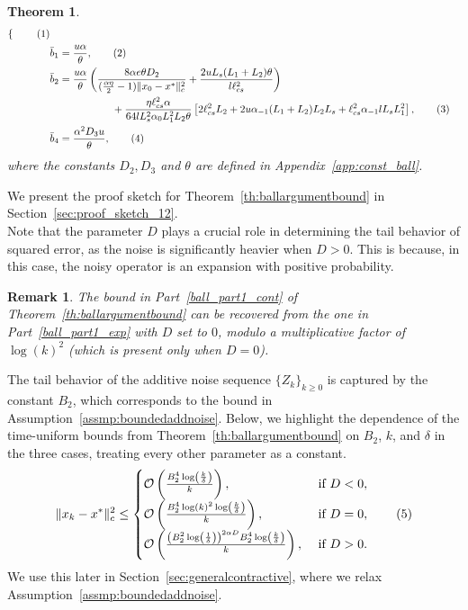 \documentclass{article}
\newcommand{\numberthis}{\addtocounter{equation}{1}\tag{\theequation}}
\newcommand{\lrp}[1]{\left( #1 \right)}
\newcommand{\lrs}[1]{\left[ #1 \right]}
\newcommand{\lcs}{\ell_{cs}}
\newtheorem{theorem}{Theorem}[section]
\newtheorem{remark}{Remark}
\begin{document}
\begin{theorem}
\begin{align*}
\begin{cases}
        \end{cases}\numberthis\label{eq:abar1} \\
        &\bar{b}_1 = \frac{u\alpha }{\theta}, \numberthis\label{eq:bar1} \\
        &\bar{b}_2 = \frac{u\alpha}{\theta}\lrp{ \frac{8\alpha e \theta D_2}{(\frac{\alpha \eta}{2} - 1)\|x_0 - x^*\|^2_c} + \frac{ 2u L_s (L_1 + L_2) \theta }{ l\lcs^2}} \\
        &\qquad\qquad\qquad + \frac{\eta\lcs^2 \alpha}{64 l L^2_s \alpha_0 L^2_1 L_2 \theta }\lrs{2\lcs^2 L_2 +  2 u \alpha_{-1} (L_1 + L_2)  L_2 L_s + \lcs^2 \alpha_{-1} l L_s L^2_1 }, \numberthis\label{eq:bar2} \\
        &\bar{b}_4 = \frac{\alpha^2 D_3 u}{\theta},\numberthis\label{eq:bar4}
    \end{align*}
    where the constants $D_2, D_3$ and $\theta$ are defined in Appendix~\ref{app:const_ball}.
\end{theorem}
We present the proof sketch for Theorem~\ref{th:ballargumentbound} in Section~\ref{sec:proof_sketch_12}.\\

Note that the parameter $D$ plays a crucial role in determining the tail behavior of squared error, as the noise is significantly heavier when $D > 0$. This is because, in this case, the noisy operator is an expansion with positive probability. 


\begin{remark}\label{rem:reduction}
    The bound in Part~\ref{ball_part1_cont} of Theorem~\ref{th:ballargumentbound} can be recovered from the one in Part~\ref{ball_part1_exp} with $D$ set to $0$, modulo a multiplicative factor of $\log(k)^2$ (which is present only when $D = 0$). 
\end{remark}


The tail behavior of the additive noise sequence $\{Z_k\}_{k\geq 0}$ is captured by the constant $B_2$, which corresponds to the bound in Assumption~\ref{assmp:boundedaddnoise}. %
Below, we highlight the dependence of the time-uniform bounds from Theorem~\ref{th:ballargumentbound} on $B_2$, $k$, and $\delta$ in the three cases, treating every other parameter as a constant.
\[
    \|x_k - x^*\|^2_c \le \begin{cases}
        \mathcal{O}\lrp{\frac{B^4_2 \log\left(\frac{k}{\delta}\right)}{k}}, & \text{ if } D < 0, \\
        \mathcal{O}\lrp{\frac{B^4_2 \log(k)^2 \log\left(\frac{k}{\delta}\right) }{k}}, & \text{ if } D = 0, \\
        \mathcal{O}\lrp{ \frac{\lrp{B^2_2 \log\left(\frac{1}{\delta}\right)}^{2\alpha D} B^4_2 \log\left(\frac{k}{\delta}\right)}{k} }, & \text{ if } D > 0.
    \end{cases}\numberthis\label{eq:B_2dep}
\]
We use this later in Section~\ref{sec:generalcontractive}, where we relax Assumption~\ref{assmp:boundedaddnoise}. %
\end{document}
